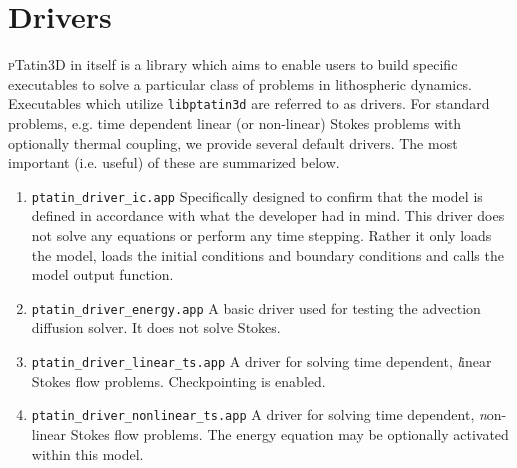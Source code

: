 \documentclass[paper=a4, fontsize=11pt,twoside]{scrartcl}
\newcommand{\ptat}{{{\textsc pTatin3D}}}
\newcommand{\unix}[1]{\texttt{\footnotesize #1}}
\begin{document}
{{%
\newpage
\section{Drivers}
{\ptat} in itself is a library which aims to enable users to build specific executables to solve a particular class of problems in lithospheric dynamics.
Executables which utilize \unix{libptatin3d} are referred to as drivers.
For standard problems, e.g. time dependent linear (or non-linear) Stokes problems with optionally thermal coupling, we provide several default drivers.
The most important (i.e. useful) of these are summarized below.

\begin{enumerate}
	\item \unix{ptatin\_driver\_ic.app}
	Specifically designed to confirm that the model is defined in accordance with what the developer had in mind. This driver does not solve any equations or perform any time stepping. Rather it only loads the model, loads the initial conditions and boundary conditions and calls the model output function.
	
	\item \unix{ptatin\_driver\_energy.app}
	A basic driver used for testing the advection diffusion solver. It does not solve Stokes.
	
	\item \unix{ptatin\_driver\_linear\_ts.app}
	A driver for solving time dependent, {\textit linear} Stokes flow problems. Checkpointing is enabled.

	\item \unix{ptatin\_driver\_nonlinear\_ts.app}
	A driver for solving time dependent, {\textit non-linear} Stokes flow problems. The energy equation may be optionally activated within this model.
\end{enumerate}

}}
\end{document}
